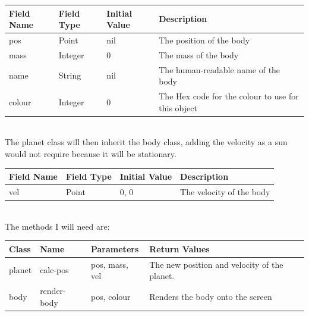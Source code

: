 \begin{tabularx}{\linewidth}{lllX}
	Field Name & Field Type & Initial Value & Description \\ \hline
	pos	& Point		& nil		& The position of the body \\
	mass	& Integer	& 0		& The mass of the body \\
	name	& String	& nil 		& The human-readable name of the
							body \\
	colour	& Integer	& 0		& The Hex code for the colour to
							use for this object \\
\end{tabularx} \\

The planet class will then inherit the body class, adding the velocity as a sun
would not require because it will be stationary. \\

\begin{tabularx}{\linewidth}{lllX} 
	Field Name & Field Type & Initial Value & Description \\ \hline
	vel	& Point		& 0, 0		& The velocity of the body \\
\end{tabularx} \\

The methods I will need are: \\

\begin{tabularx}{\linewidth}{lllX}
	Class & Name & Parameters & Return Values \\ \hline
	planet & calc-pos & pos, mass, vel & The new position and velocity of
	the planet. \\
	body & render-body & pos, colour & Renders the body onto the screen
\end{tabularx} \\


